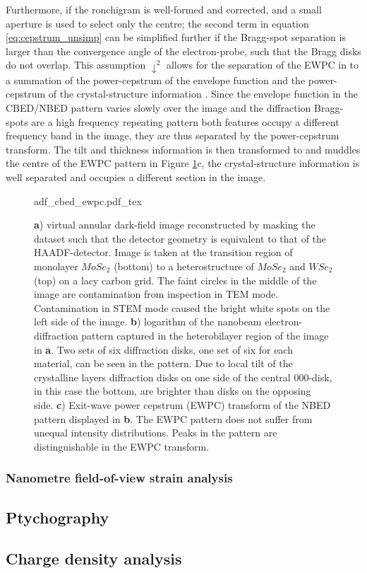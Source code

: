 Furthermore, if the ronchigram is well-formed and corrected, and a small aperture is used to select only the centre; the second term in equation \ref{eq:cepstrum_unsimp} can be simplified further if the Bragg-spot separation is larger than the convergence angle of the electron-probe, such that the Bragg disks do not overlap. This assumption $\downarrow^2$ allows for the separation of the EWPC in to a summation of the power-cepstrum of the envelope function and the power-cepstrum of the crystal-structure information \cite{padgettExitwavePowercepstrumTransform2020}. Since the envelope function in the CBED/NBED pattern varies slowly over the image and the diffraction Bragg-spots are a high frequency repeating pattern both features occupy a different frequency band in the image, they are thus separated by the power-cepstrum transform. The tilt and thickness information is then transformed to and muddles the centre of the EWPC pattern in Figure \ref{fig:adf_nbed_ewpc}c, the crystal-structure information is well separated and occupies a different section in the image.

\begin{figure}
	\centering
	\def\svgwidth{0.9\linewidth}
	{adf_cbed_ewpc.pdf_tex}
	\caption{\textbf{a}) virtual annular dark-field image reconstructed by masking the dataset such that the detector geometry is equivalent to that of the HAADF-detector. Image is taken at the transition region of monolayer $MoSe_2$ (bottom) to a heterostructure of $MoSe_2$ and $WSe_2$ (top) on a lacy carbon grid. The faint circles in the middle of the image are contamination from inspection in TEM mode. Contamination in STEM mode caused the bright white spots on the left side of the image. \textbf{b}) logarithm of the nanobeam electron-diffraction pattern captured in the heterobilayer region of the image in \textbf{a}. Two sets of six diffraction disks, one set of six for each material, can be seen in the pattern. Due to local tilt of the crystalline layers diffraction disks on one side of the central $000$-disk, in this case the bottom, are brighter than disks on the opposing side. \textbf{c}) Exit-wave power cepstrum (EWPC) transform of the NBED pattern displayed in \textbf{b}. The EWPC pattern does not suffer from unequal intensity distributions. Peaks in the pattern are distinguishable in the EWPC transform.}
	\label{fig:adf_nbed_ewpc}
\end{figure}

\subsubsection{Nanometre field-of-view strain analysis}

\subsection{Ptychography}

\subsection{Charge density analysis}

